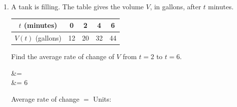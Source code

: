 \documentclass[10pt]{article}
\begin{document}
\begin{enumerate}[itemsep=10pt]
\item A tank is filling. The table gives the volume $V$, in gallons, after
      $t$ minutes.

\smallskip
\renewcommand{\arraystretch}{1.4}
\begin{center}
\begin{tabular}{|c|c|c|c|c|}
\hline
$t$ (minutes) & 0 & 2 & 4 & 6 \\
\hline
$V(t)$ (gallons) & 12 & 20 & 32 & 44 \\
\hline
\end{tabular}
\end{center}

\smallskip
Find the average rate of change of $V$ from $t = 2$ to $t = 6$.

\begin{work}
   &=  \\
                            &= 6
\end{work}

Average rate of change $= $ \blank{2cm} \qquad Units: \blank{4.6cm}

\end{enumerate}
\end{document}
